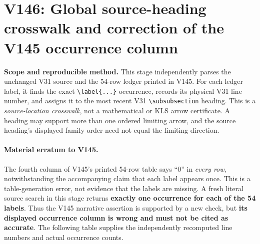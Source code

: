 \documentclass[11pt]{article}
\begin{document}
\section{V146: Global source-heading crosswalk and correction of the V145 occurrence column}
\label{sec:v146-crosswalk}
\noindent\textbf{Scope and reproducible method.} This stage independently parses the unchanged V31 source and the 54-row ledger printed in V145. For each ledger label, it finds the exact \verb|\label{...}| occurrence, records its physical V31 line number, and assigns it to the most recent V31 \verb|\subsubsection| heading. This is a \emph{source-location crosswalk}, not a mathematical or KLS arrow certificate. A heading may support more than one ordered limiting arrow, and the source heading's displayed family order need not equal the limiting direction.

\paragraph{Material erratum to V145.} The fourth column of V145's printed 54-row table says ``0'' in \emph{every row}, notwithstanding the accompanying claim that each label appears once. This is a table-generation error, not evidence that the labels are missing. A fresh literal source search in this stage returns \textbf{exactly one occurrence for each of the 54 labels}. Thus the V145 narrative assertion is supported by a new check, but \textbf{its displayed occurrence column is wrong and must not be cited as accurate}. The following table supplies the independently recomputed line numbers and actual occurrence counts.
\end{document}
